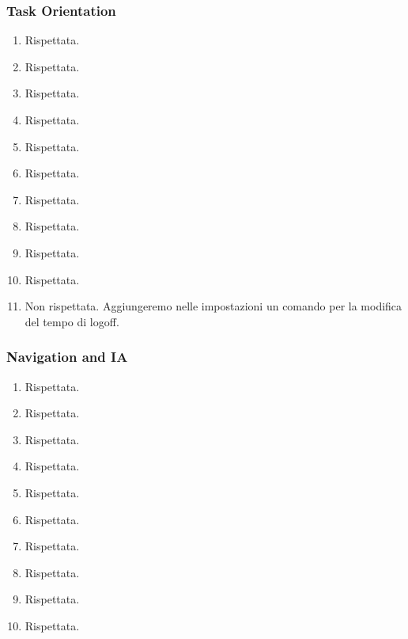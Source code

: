 \documentclass[../Report.tex]{subfiles}
\begin{document}
    \subsubsection{Task Orientation}
    \begin{enumerate}
        \item Rispettata.
        \item Rispettata.
        \item Rispettata. 
        \item Rispettata.
        \item Rispettata.
        \item Rispettata. 
        \item Rispettata.
        \item Rispettata.
        \item Rispettata.
        \item Rispettata.
        \item Non rispettata. Aggiungeremo nelle impostazioni un comando per la modifica del tempo di logoff.
    \end{enumerate}

    \subsubsection{Navigation and IA}
    \begin{enumerate}
        \item Rispettata.
        \item Rispettata.
        \item Rispettata.
        \item Rispettata.
        \item Rispettata.
        \item Rispettata.
        \item Rispettata.
        \item Rispettata.
        \item Rispettata.
        \item Rispettata.
    \end{enumerate}
\end{document}
